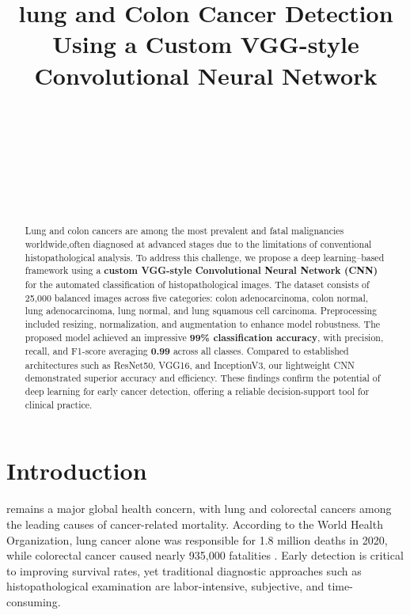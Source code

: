 \documentclass{ieeeaccess}
\begin{document}
\title{lung and Colon Cancer Detection Using a Custom VGG-style Convolutional Neural Network}

\author{
\\
\and 
\\
\\
\and\\
\\
}

\begin{abstract}
Lung and colon cancers are among the most prevalent and fatal malignancies worldwide,often diagnosed at advanced stages due to the limitations of conventional histopathological analysis. To address this challenge, we propose a deep learning--based framework using a \textbf{custom VGG-style Convolutional Neural Network (CNN)} for the automated classification of histopathological images. The dataset consists of 25,000 balanced images across five categories: colon adenocarcinoma, colon normal, lung adenocarcinoma, lung normal, and lung squamous cell carcinoma. Preprocessing included resizing, normalization, and augmentation to enhance model robustness. The proposed model achieved an impressive \textbf{99\% classification accuracy}, with precision, recall, and F1-score averaging \textbf{0.99} across all classes. Compared to established architectures such as ResNet50, VGG16, and InceptionV3, our lightweight CNN demonstrated superior accuracy and efficiency. These findings confirm the potential of deep learning for early cancer detection, offering a reliable decision-support tool for clinical practice.
\end{abstract}

\maketitle

\section{Introduction}
\label{sec:introduction}
 remains a major global health concern, with lung and colorectal cancers among the leading causes of cancer-related mortality. According to the World Health Organization, lung cancer alone was responsible for 1.8 million deaths in 2020, while colorectal cancer caused nearly 935,000 fatalities \cite{b1}. Early detection is critical to improving survival rates, yet traditional diagnostic approaches such as histopathological examination are labor-intensive, subjective, and time-consuming.
\end{document}
